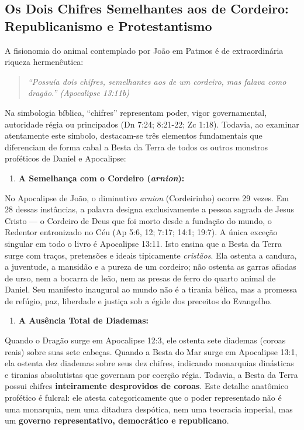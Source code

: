 \subsection{Os Dois Chifres Semelhantes aos de Cordeiro: Republicanismo e Protestantismo}


A fisionomia do animal contemplado por João em Patmos é de extraordinária riqueza hermenêutica:


\begin{quote}
\itshape \textit{``Possuía dois chifres, semelhantes aos de um cordeiro, mas falava como dragão.''} (Apocalipse 13:11b)
\end{quote}


Na simbologia bíblica, ``chifres'' representam poder, vigor governamental, autoridade régia ou principados (Dn 7:24; 8:21-22; Zc 1:18). Todavia, ao examinar atentamente este símbolo, destacam-se três elementos fundamentais que diferenciam de forma cabal a Besta da Terra de todos os outros monstros proféticos de Daniel e Apocalipse:

\begin{enumerate}
  \item \textbf{A Semelhança com o Cordeiro (\textit{arnion}):}
\end{enumerate}

No Apocalipse de João, o diminutivo \textit{arnion} (Cordeirinho) ocorre 29 vezes. Em 28 dessas instâncias, a palavra designa exclusivamente a pessoa sagrada de Jesus Cristo — o Cordeiro de Deus que foi morto desde a fundação do mundo, o Redentor entronizado no Céu (Ap 5:6, 12; 7:17; 14:1; 19:7). A única exceção singular em todo o livro é Apocalipse 13:11. Isto ensina que a Besta da Terra surge com traços, pretensões e ideais tipicamente \textit{cristãos}. Ela ostenta a candura, a juventude, a mansidão e a pureza de um cordeiro; não ostenta as garras afiadas de urso, nem a bocarra de leão, nem as presas de ferro do quarto animal de Daniel. Seu manifesto inaugural ao mundo não é a tirania bélica, mas a promessa de refúgio, paz, liberdade e justiça sob a égide dos preceitos do Evangelho.

\begin{enumerate}
  \item \textbf{A Ausência Total de Diademas:}
\end{enumerate}

Quando o Dragão surge em Apocalipse 12:3, ele ostenta sete diademas (coroas reais) sobre suas sete cabeças. Quando a Besta do Mar surge em Apocalipse 13:1, ela ostenta dez diademas sobre seus dez chifres, indicando monarquias dinásticas e tiranias absolutistas que governam por coerção régia. Todavia, a Besta da Terra possui chifres \textbf{inteiramente desprovidos de coroas}. Este detalhe anatômico profético é fulcral: ele atesta categoricamente que o poder representado não é uma monarquia, nem uma ditadura despótica, nem uma teocracia imperial, mas um \textbf{governo representativo, democrático e republicano}.

